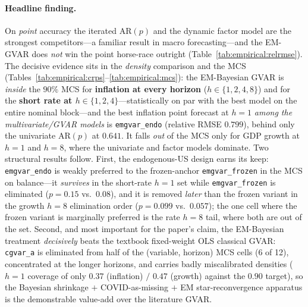 \documentclass[11pt]{article}
\theoremstyle{definition}
\theoremstyle{remark}
\begin{document}
\paragraph{Headline finding.} On \emph{point} accuracy the iterated
AR$(p)$ and the dynamic factor model are the strongest competitors---a
familiar result in macro forecasting---and the EM-GVAR does \emph{not}
win the point horse-race outright (Table~\ref{tab:empirical:relrmse}).
The decisive evidence sits in the \emph{density} comparison and the MCS
(Tables~\ref{tab:empirical:crps}--\ref{tab:empirical:mcs}): the EM-Bayesian
GVAR is \emph{inside} the $90\%$ MCS for \textbf{inflation at every
horizon} ($h\in\{1,2,4,8\}$) and for the \textbf{short rate at
$h\in\{1,2,4\}$}---statistically on par with the best model on the entire
nominal block---and the best inflation point forecast at $h{=}1$ \emph{among
the multivariate/GVAR models} is \texttt{emgvar\_endo} (relative RMSE $0.799$),
behind only the univariate AR$(p)$ at $0.641$. It falls \emph{out} of the
MCS only for GDP growth at $h{=}1$ and $h{=}8$, where the univariate and
factor models dominate. Two structural results follow. First, the
endogenous-US design earns its keep: \texttt{emgvar\_endo} is weakly
preferred to the frozen-anchor \texttt{emgvar\_frozen} in the MCS on
balance---it \emph{survives} in the short-rate $h{=}1$ set while
\texttt{emgvar\_frozen} is eliminated ($p=0.15$ vs.\ $0.08$), and it is
removed \emph{later} than the frozen variant in the growth $h{=}8$
elimination order ($p=0.099$ vs.\ $0.057$); the one cell where the frozen
variant is marginally preferred is the rate $h{=}8$ tail, where both are
out of the set. Second, and most important for the paper's claim, the EM-Bayesian
treatment \emph{decisively} beats the textbook fixed-weight OLS classical
GVAR: \texttt{cgvar\_a} is eliminated from half of the (variable, horizon)
MCS cells (6 of 12), concentrated at the longer horizons, and carries badly
miscalibrated densities ($h{=}1$ coverage of only $0.37$ (inflation) $/$ $0.47$
(growth) against the $0.90$ target), so the Bayesian shrinkage
$+$ COVID-as-missing $+$ EM star-reconvergence apparatus is the
demonstrable value-add over the literature GVAR.
\end{document}
